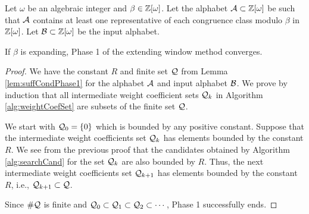 \begin{theo}
\label{thm:suffCondPhase1}
Let $\omega$ be an algebraic integer and $\beta\in\mathbb{Z}[\omega]$. Let the alphabet $\mathcal{A}\subset\mathbb{Z}[\omega]$ be such that $\mathcal{A}$ contains at least one representative of each congruence class modulo $\beta$ in $\mathbb{Z}[\omega]$. Let $\mathcal{B}\subset\mathbb{Z}[\omega]$ be the input alphabet. 

If $\beta$ is expanding, Phase 1 of the extending window method converges.
\end{theo}
\begin{proof}
We have the constant $R$ and finite set $\mathcal{Q}$ from Lemma \ref{lem:suffCondPhase1} for the alphabet $\mathcal{A}$ and input alphabet $\mathcal{B}$. We prove by induction that  all intermediate weight coefficient sets $\mathcal{Q}_k$ in Algorithm \ref{alg:weightCoefSet} are subsets of the finite set $\mathcal{Q}$. 

We start with $\mathcal{Q}_0=\{0\}$ which is bounded by any positive constant. Suppose that the intermediate weight coefficients set $\mathcal{Q}_k$ has elements bounded by the constant $R$. We see from the previous  proof that the candidates obtained by Algorithm \ref{alg:searchCand} for the set $\mathcal{Q}_k$ are also bounded by $R$. Thus, the next intermediate weight coefficients set $\mathcal{Q}_{k+1}$ has elements bounded by the constant $R$, i.e., $\mathcal{Q}_{k+1}\subset\mathcal{Q}$. 

Since $\#\mathcal{Q}$ is finite and $\mathcal{Q}_0\subset\mathcal{Q}_1\subset\mathcal{Q}_2\subset\cdots$,  Phase 1 successfully ends. 
\end{proof}



